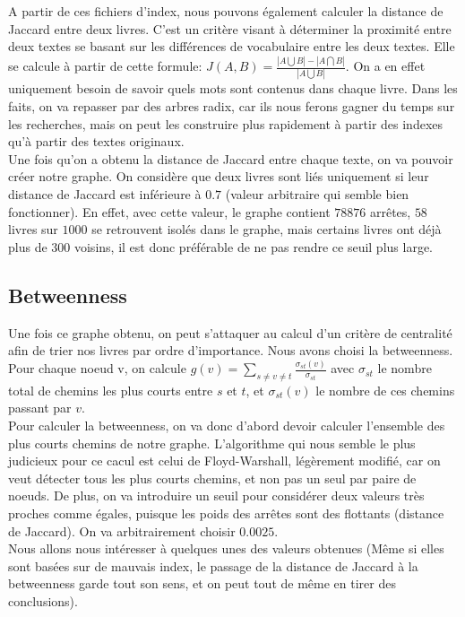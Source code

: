 \documentclass{article}
\begin{document}
A partir de ces fichiers d'index, nous pouvons également calculer la distance de Jaccard entre deux livres. C'est un critère visant à déterminer la proximité entre deux textes se basant sur les différences de vocabulaire entre les deux textes. Elle se calcule à partir de cette formule:
$J(A,B) = \frac{|A \bigcup B | - | A \bigcap B |}{|A \bigcup B |}$. On a en effet uniquement besoin de savoir quels mots sont contenus dans chaque livre. Dans les faits, on va repasser par des arbres radix, car ils nous ferons gagner du temps sur les recherches, mais on peut les construire plus rapidement à partir des indexes qu'à partir des textes originaux.\\
Une fois qu'on a obtenu la distance de Jaccard entre chaque texte, on va pouvoir créer notre graphe. On considère que deux livres sont liés uniquement si leur distance de Jaccard est inférieure à $0.7$ (valeur arbitraire qui semble bien fonctionner). En effet, avec cette valeur, le graphe contient $78876$ arrêtes, $58$ livres sur $1000$ se retrouvent isolés dans le graphe, mais certains livres ont déjà plus de $300$ voisins, il est donc préférable de ne pas rendre ce seuil plus large.

\subsection{Betweenness}

Une fois ce graphe obtenu, on peut s'attaquer au calcul d'un critère de centralité afin de trier nos livres par ordre d'importance. Nous avons choisi la betweenness.
Pour chaque noeud v, on calcule $g(v)= \sum_{s \neq v \neq t}\frac{\sigma_{st}(v)}{\sigma_{st}}$ avec  $\sigma_{st}$ le nombre total de chemins les plus courts entre $s$ et $t$, et  $\sigma_{st}(v)$ le nombre de ces chemins passant par $v$.\\

Pour calculer la betweenness, on va donc d'abord devoir calculer l'ensemble des plus courts chemins de notre graphe. L'algorithme qui nous semble le plus judicieux pour ce cacul est celui de Floyd-Warshall, légèrement modifié, car on veut détecter tous les plus courts chemins, et non pas un seul par paire de noeuds. De plus, on va introduire un seuil pour considérer deux valeurs très proches comme égales, puisque les poids des arrêtes sont des flottants (distance de Jaccard). On va arbitrairement choisir $0.0025$.\\

Nous allons nous intéresser à quelques unes des valeurs obtenues (Même si elles sont basées sur de mauvais index, le passage de la distance de Jaccard à la betweenness garde tout son sens, et on peut tout de même en tirer des conclusions).\\
\end{document}

